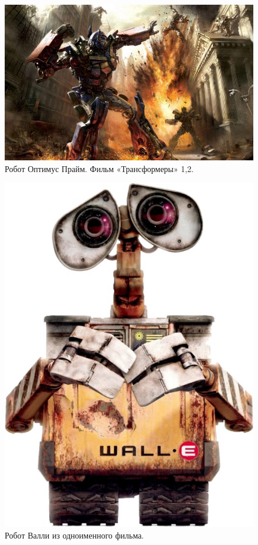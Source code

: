 \begin{figure}[h!]
	\begin{center}
		\includegraphics[width=0.98\linewidth]{chapters/chapter1/images/5}
		\caption{Робот Оптимус Прайм. Фильм «Трансформеры» 1,2.}
		\label{ris:image1x5}
	\end{center}
\end{figure}
\begin{figure}[h!]
	\begin{center}
		\includegraphics[width=1\linewidth]{chapters/chapter1/images/6}
		\caption{Робот Валли из одноименного фильма.}
		\label{ris:image1x6}
	\end{center}
\end{figure}	
